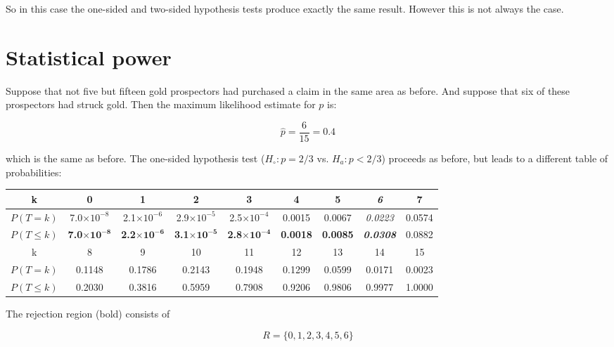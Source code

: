 So in this case the one-sided and two-sided hypothesis tests produce
exactly the same result. However this is not always the case.

\section{Statistical power}
\label{sec:power}

Suppose that not five but fifteen gold prospectors had purchased a
claim in the same area as before. And suppose that six of these
prospectors had struck gold. Then the maximum likelihood estimate for
$p$ is:

\[
\hat{p} = \frac{6}{15} = 0.4
\]

\noindent which is the same as before. The one-sided hypothesis test
($H_\circ: p={2/3}$ vs. $H_a: p<2/3$) proceeds as before, but leads to
a different table of probabilities:

\begin{center}
  \begin{tabular}{c@{\gap}c@{\gap}c@{\gap}c@{\gap}c@{\gap}c@{\gap}c@{\gap}c@{\gap}c}
    k & \textbf{0} & \textbf{1} & \textbf{2} & \textbf{3} & \textbf{4}
    & \textbf{5} & \textbf{\textit{6}} & 7 \\ \hline $P(T=k)$ &
    7.0$\times{10}^{-8}$ & 2.1$\times{10}^{-6}$ & 2.9$\times{10}^{-5}$
    & 2.5$\times{10}^{-4}$ & 0.0015 & 0.0067 & \textit{0.0223} & 0.0574 \\
    $P({T}\leq{k})$ & \textbf{7.0}$\mathbf{\times{10}^{-8}}$
    & \textbf{2.2}$\mathbf{\times{10}^{-6}}$ &
    \textbf{3.1}$\mathbf{\times{10}^{-5}}$ &
    \textbf{2.8}$\mathbf{\times{10}^{-4}}$ & \textbf{0.0018} &
    \textbf{0.0085} & \textbf{\textit{0.0308}} & 0.0882 \\
    k & 8 & 9 & 10 & 11 & 12 & 13 & 14 & 15 \\
    \hline $P(T=k)$ & 0.1148 & 0.1786 & 0.2143
    & 0.1948 & 0.1299 & 0.0599 & 0.0171 & 0.0023 \\
    $P({T}\leq{k})$ & 0.2030 & 0.3816 & 0.5959 & 0.7908 &
    0.9206 & 0.9806 & 0.9977 & 1.0000 \\
  \end{tabular}
\end{center}

The rejection region (bold) consists of

\begin{equation}
  R=\{0,1,2,3,4,5,6\}
  \label{eq:1sidedbinomtest15}
\end{equation}

